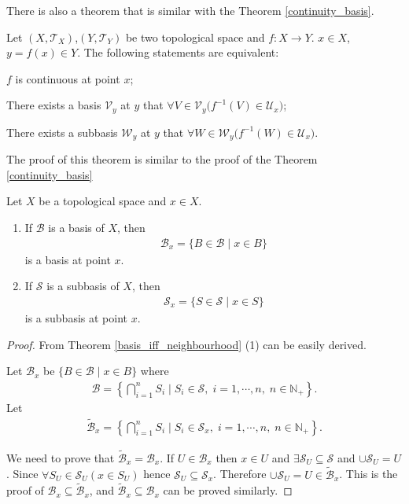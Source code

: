 \documentclass[openany]{book}
\begin{document}
There is also a theorem that is similar with the Theorem \ref{continuity_basis}.

\begin{theorem}\label{continuity_basis_neighbourhood}
Let $(X,\mathscr T_X)$,$(Y,\mathscr T_Y)$ be two topological space and $f \colon X\to Y$.
$x\in X$, $y = f(x)\in Y$.
The following statements are equivalent:
\begin{conditionlist}[label=(\arabic*)]
\item $f $ is continuous at point $x$;
\item There exists a basis $\mathscr V_y$ at $y$ that $\forall V\in \mathscr V_y\big(
	f^{-1}(V) \in \mathscr U_x\big)$;
\item There exists a subbasis $\mathscr W_y$ at $y$ that $\forall W\in \mathscr W_y\big(
	f^{-1}(W) \in \mathscr U_x\big)$.
\end{conditionlist}
\end{theorem}
The proof of this theorem is similar to the proof of the Theorem \ref{continuity_basis}

\begin{theorem}\label{basis_subbasis_topology_and_neighbourhood}
Let $X$ be a topological space and $x \in X$.
\begin{enumerate}[label=(\arabic*)]
\item If $\mathscr B$ is a basis of $X$, then
\begin{align*}
	\mathscr B_x = \{B\in \mathscr B\mid x \in B\}
\end{align*}
is a basis at point $x$.
\item If $\mathscr S$ is a subbasis of $X$, then
\begin{align*}
	\mathscr S_x = \{S\in \mathscr S\mid x \in S\}
\end{align*}
is a subbasis at point $x$.
\end{enumerate}
\end{theorem}
\begin{proof}
From Theorem \ref{basis_iff_neighbourhood} (1) can be easily derived. 

Let $\mathscr B_x$ be $\{B\in \mathscr B\mid x\in B\}$ where
\begin{align*}
	\mathscr B = \left\{
		\bigcap\limits_{i=1}^n S_i \mid
			S_i \in \mathscr S,\;i=1,\cdots,n,\;n\in\mathbb N_+\right\}.
\end{align*}
Let
\begin{align*}
	\tilde{\mathscr B}_x = \left\{
		\bigcap\limits_{i=1}^n S_i \mid
			S_i \in \mathscr S_x,\;i=1,\cdots,n,\;n\in\mathbb N_+\right\}.
\end{align*}

We need to prove that $\tilde{\mathscr B}_x = \mathscr B_x$. 
If $U \in \mathscr B_x$ then
$x\in U$ and $\exists \mathscr S_U \subseteq \mathscr S$ and $\cup \mathscr S_U = U$.
Since $\forall S_U \in \mathscr S_U (x\in S_U)$ hence $\mathscr S_U \subseteq \mathscr S_x$.
Therefore $\cup \mathscr S_U = U \in \tilde{\mathscr B}_x$. 
This is the proof of $\mathscr B_x \subseteq \tilde{\mathscr B}_x$, 
and $\tilde{\mathscr B}_x \subseteq \mathscr B_x$ can be proved similarly.
\end{proof}
\end{document}
